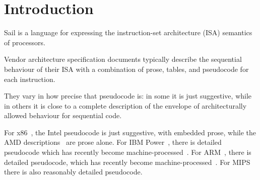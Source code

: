 \section{Introduction}
\label{sec:intro}

Sail is a language for expressing the instruction-set
architecture (ISA) semantics of processors.

Vendor architecture specification documents typically describe the
sequential behaviour of their ISA with a combination of prose, tables,
and pseudocode for each instruction.

They vary in how precise that pseudocode is: in some it is just
suggestive, while in others it is close to a complete description of
the envelope of architecturally allowed behaviour for sequential code.

For x86~\cite{Intel61}, the Intel pseudocode is just suggestive, with
embedded prose, while the AMD descriptions~\cite{AMD_3_21} are prose
alone.  For IBM Power~\cite{Power3.0B}, there is detailed pseudocode
which has recently become machine-processed~\cite{Leighton21}.
For ARM~\cite{armarmv8}, there is detailed
pseudocode, which has recently become machine-processed~\cite{Reid16}.
For MIPS~\cite{MIPS64-II,MIPS64-III} there is also reasonably detailed
pseudocode.



